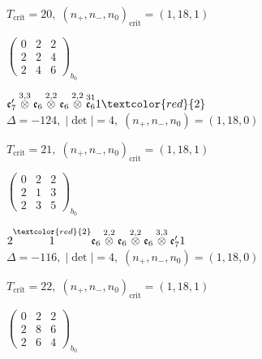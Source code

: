 \documentclass[10pt]{article}
\begin{document}
\hspace{1em}$T_{\text{crit}}=20,\; (n_+,n_-,n_0)_{\text{crit}}=(1,18,1)$

\hspace{2em}$\left(\begin{smallmatrix}0 & 2 & 2 \\ 2 & 2 & 4 \\ 2 & 4 & 6\end{smallmatrix}\right)_{\!b_0}$

\smallskip

$\mathfrak{e}_7'\overset{3,3}{\otimes}\mathfrak{e}_6\overset{2,2}{\otimes}\mathfrak{e}_6\overset{2,2}{\otimes}\overset{31}{\mathfrak{e}_6}1\textcolor{red}{2}$ \quad $\Delta=-124,\; |\det|=4,\; (n_+,n_-,n_0)=(1,18,0)$

\hspace{1em}$T_{\text{crit}}=21,\; (n_+,n_-,n_0)_{\text{crit}}=(1,18,1)$

\hspace{2em}$\left(\begin{smallmatrix}0 & 2 & 2 \\ 2 & 1 & 3 \\ 2 & 3 & 5\end{smallmatrix}\right)_{\!b_0}$

\smallskip

$2\overset{\textcolor{red}{2}}{1}\mathfrak{e}_6\overset{2,2}{\otimes}\mathfrak{e}_6\overset{2,2}{\otimes}\mathfrak{e}_6\overset{3,3}{\otimes}\mathfrak{e}_7'1$ \quad $\Delta=-116,\; |\det|=4,\; (n_+,n_-,n_0)=(1,18,0)$

\hspace{1em}$T_{\text{crit}}=22,\; (n_+,n_-,n_0)_{\text{crit}}=(1,18,1)$

\hspace{2em}$\left(\begin{smallmatrix}0 & 2 & 2 \\ 2 & 8 & 6 \\ 2 & 6 & 4\end{smallmatrix}\right)_{\!b_0}$

\smallskip
\end{document}
